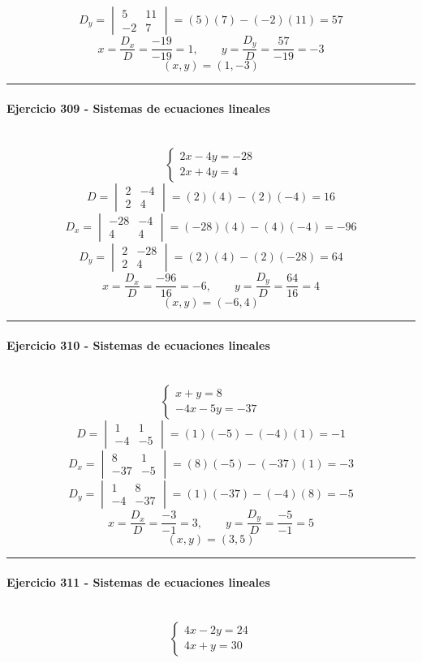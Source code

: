 \documentclass[10pt,a4paper]{article}
\newcommand{\res}[1]{\paragraph{#1}\mbox{}\\[-1.2em]}
\begin{document}
\[ D_y=\begin{vmatrix}5&11\\-2&7\end{vmatrix}=(5)(7)-(-2)(11)=57 \]
\[ x=\frac{D_x}{D}=\frac{-19}{-19}=1,\qquad y=\frac{D_y}{D}=\frac{57}{-19}=-3 \]
\[ \boxed{(x,y)=(1,-3)} \]
\vspace{1mm}\hrule\vspace{2mm}
\res{Ejercicio 309 - Sistemas de ecuaciones lineales}
\[ \begin{cases}2 x - 4 y=-28\\2 x + 4 y=4\end{cases} \]
\[ D=\begin{vmatrix}2&-4\\2&4\end{vmatrix}=(2)(4)-(2)(-4)=16 \]
\[ D_x=\begin{vmatrix}-28&-4\\4&4\end{vmatrix}=(-28)(4)-(4)(-4)=-96 \]
\[ D_y=\begin{vmatrix}2&-28\\2&4\end{vmatrix}=(2)(4)-(2)(-28)=64 \]
\[ x=\frac{D_x}{D}=\frac{-96}{16}=-6,\qquad y=\frac{D_y}{D}=\frac{64}{16}=4 \]
\[ \boxed{(x,y)=(-6,4)} \]
\vspace{1mm}\hrule\vspace{2mm}
\res{Ejercicio 310 - Sistemas de ecuaciones lineales}
\[ \begin{cases}x + y=8\\- 4 x - 5 y=-37\end{cases} \]
\[ D=\begin{vmatrix}1&1\\-4&-5\end{vmatrix}=(1)(-5)-(-4)(1)=-1 \]
\[ D_x=\begin{vmatrix}8&1\\-37&-5\end{vmatrix}=(8)(-5)-(-37)(1)=-3 \]
\[ D_y=\begin{vmatrix}1&8\\-4&-37\end{vmatrix}=(1)(-37)-(-4)(8)=-5 \]
\[ x=\frac{D_x}{D}=\frac{-3}{-1}=3,\qquad y=\frac{D_y}{D}=\frac{-5}{-1}=5 \]
\[ \boxed{(x,y)=(3,5)} \]
\vspace{1mm}\hrule\vspace{2mm}
\res{Ejercicio 311 - Sistemas de ecuaciones lineales}
\[ \begin{cases}4 x - 2 y=24\\4 x + y=30\end{cases} \]
\end{document}

